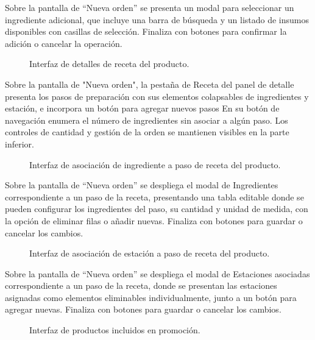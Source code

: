 Sobre la pantalla de ``Nueva orden'' se presenta un modal para seleccionar un ingrediente adicional, que incluye una barra de búsqueda y un listado de insumos disponibles con casillas de selección. Finaliza con botones para confirmar la adición o cancelar la operación.

\begin{figure}[H]
    \centering
    
    \caption{Interfaz de detalles de receta del producto.}
    \label{fig:ui-caj-12}
\end{figure}

Sobre la pantalla de "Nueva orden", la pestaña de Receta del panel de detalle presenta los pasos de preparación con sus elementos colapsables de ingredientes y estación, e incorpora un botón para agregar nuevos pasos En su botón de navegación enumera el número de ingredientes sin asociar a algún paso. Los controles de cantidad y gestión de la orden se mantienen visibles en la parte inferior.

\begin{figure}[H]
    \centering
    
    \caption{Interfaz de asociación de ingrediente a paso de receta del producto.}
    \label{fig:ui-caj-12-a}
\end{figure}

Sobre la pantalla de ``Nueva orden'' se despliega el modal de Ingredientes correspondiente a un paso de la receta, presentando una tabla editable donde se pueden configurar los ingredientes del paso, su cantidad y unidad de medida, con la opción de eliminar filas o añadir nuevas. Finaliza con botones para guardar o cancelar los cambios.

\begin{figure}[H]
    \centering
    
    \caption{Interfaz de asociación de estación a paso de receta del producto.}
    \label{fig:ui-caj-12-b}
\end{figure}

Sobre la pantalla de ``Nueva orden'' se despliega el modal de Estaciones asociadas correspondiente a un paso de la receta, donde se presentan las estaciones asignadas como elementos eliminables individualmente, junto a un botón para agregar nuevas. Finaliza con botones para guardar o cancelar los cambios.

\begin{figure}[H]
    \centering
    
    \caption{Interfaz de productos incluidos en promoción.}
    \label{fig:ui-caj-15}
\end{figure}

